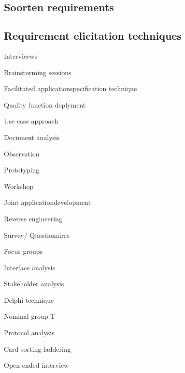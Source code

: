 \documentclass{article}
\begin{document}
\subsection{Soorten requirements}

\subsection{Requirement elicitation techniques}
\begin{list}{•}{Lijst van voorbeelden}
\item Intervieews 

\item Brainstorming sessions 

\item Facilitated applicationspecification technique 

\item Quality function deplyment 

\item Use case approach 

\item Document analysis 

\item Observation 

\item Prototyping 

\item Workshop 

\item Joint applicationdevelopment 

\item Reverse engineering 

\item Survey/ Questionairre 

\item Focus groups 

\item Interface analysis 

\item Stakeholder analysis 

\item Delphi technique 

\item Nominal group T 

\item Protocol analysis 

\item Card sorting laddering 

\item Open ended-interview 
\end{list}
\end{document}

